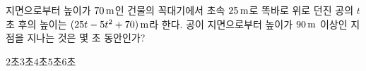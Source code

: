 지면으로부터 높이가 $70\mkern3mu \mathrm{m}$인 건물의 꼭대기에서 초속 $25\mkern3mu \mathrm{m}$로 똑바로 위로 던진 공의 $t$초 후의 높이는 $(25t-5t^2+70)\mkern3mu \mathrm{m}$라 한다. 공이 지면으로부터 높이가 $90\mkern3mu \mathrm{m}$ 이상인 지점을 지나는 것은 몇 초 동안인가?
\begin{choices32}{$2$초}{$3$초}{$4$초}{$5$초}{$6$초}\end{choices32}
